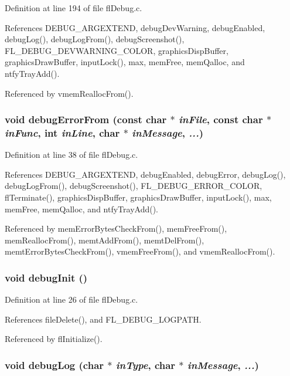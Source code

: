 Definition at line 194 of file fl\-Debug.c.

References DEBUG\_\-ARGEXTEND, debug\-Dev\-Warning, debug\-Enabled, debug\-Log(), debug\-Log\-From(), debug\-Screenshot(), FL\_\-DEBUG\_\-DEVWARNING\_\-COLOR, graphics\-Disp\-Buffer, graphics\-Draw\-Buffer, input\-Lock(), max, mem\-Free, mem\-Qalloc, and ntfy\-Tray\-Add().

Referenced by vmem\-Realloc\-From().
\subsubsection{\setlength{\rightskip}{0pt plus 5cm}void debug\-Error\-From (const char $\ast$ {\em in\-File}, const char $\ast$ {\em in\-Func}, int {\em in\-Line}, char $\ast$ {\em in\-Message},  {\em ...})}\label{flDebug_8c_71fe856a9d6b43b341ca87a8395b3120}




Definition at line 38 of file fl\-Debug.c.

References DEBUG\_\-ARGEXTEND, debug\-Enabled, debug\-Error, debug\-Log(), debug\-Log\-From(), debug\-Screenshot(), FL\_\-DEBUG\_\-ERROR\_\-COLOR, fl\-Terminate(), graphics\-Disp\-Buffer, graphics\-Draw\-Buffer, input\-Lock(), max, mem\-Free, mem\-Qalloc, and ntfy\-Tray\-Add().

Referenced by mem\-Error\-Bytes\-Check\-From(), mem\-Free\-From(), mem\-Realloc\-From(), memt\-Add\-From(), memt\-Del\-From(), memt\-Error\-Bytes\-Check\-From(), vmem\-Free\-From(), and vmem\-Realloc\-From().
\subsubsection{\setlength{\rightskip}{0pt plus 5cm}void debug\-Init ()}\label{flDebug_8c_e2643425aaa970f732820d91522a9111}




Definition at line 26 of file fl\-Debug.c.

References file\-Delete(), and FL\_\-DEBUG\_\-LOGPATH.

Referenced by fl\-Initialize().
\subsubsection{\setlength{\rightskip}{0pt plus 5cm}void debug\-Log (char $\ast$ {\em in\-Type}, char $\ast$ {\em in\-Message},  {\em ...})}\label{flDebug_8c_85f3e65773a4f1bc98b37d29c6dde276}




